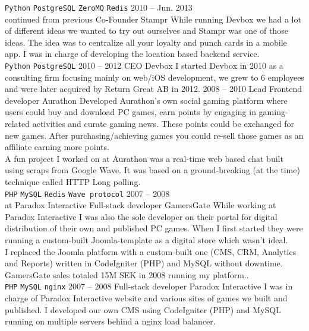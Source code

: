 \documentclass[9pt]{template} %
\begin{document}
\begin{entrylist}
{      \texttt{Python}\slashsep
      \texttt{PostgreSQL}\slashsep
      \texttt{ZeroMQ}\slashsep
      \texttt{Redis}
    }
  \entry
    {2010 -- Jun. 2013\\\footnotesize{continued from previous}}
    {Co-Founder}
    {Stampr}
    {While running Devbox we had a lot of different ideas we wanted to try out ourselves and Stampr was one of those ideas. The idea was to centralize all your loyalty and punch cards in a mobile app. I was in charge of developing the location based backend service.\\
      \texttt{Python}\slashsep
      \texttt{PostgreSQL}
    }
  \entry
    {2010 -- 2012}
    {CEO}
    {Devbox}
    {I started Devbox in 2010 as a consulting firm focusing mainly on web/iOS development, we grew to 6 employees and were later acquired by Return Great AB in 2012.}
  \entry
    {2008 -- 2010}
    {Lead Frontend developer}
    {Aurathon}
    {Developed Aurathon’s own social gaming platform where users could buy and download PC games, earn points by engaging in gaming-related activities and curate gaming news. These points could be exchanged for new games. After purchasing/achieving games you could re-sell those games as an affiliate earning more points.\\
      A fun project I worked on at Aurathon was a real-time web based chat built using scraps from Google Wave. It was based on a ground-breaking (at the time) technique called HTTP Long polling.\\
      \texttt{PHP}\slashsep
      \texttt{MySQL}\slashsep
      \texttt{Redis}\slashsep
      \texttt{Wave protocol}
    }
  \entry
    {2007 -- 2008\\\footnotesize{at Paradox Interactive}}
    {Full-stack developer}
    {GamersGate}
    {While working at Paradox Interactive I was also the sole developer on their portal for digital distribution of their own and published PC games. When I first started they were running a custom-built Joomla-template as a digital store which wasn’t ideal.\\
      I replaced the Joomla platform with a custom-built one (CMS, CRM, Analytics and Reports) written in CodeIgniter (PHP) and MySQL without downtime.\\
      GamersGate sales totaled 15M SEK in 2008 running my platform..\\
      \texttt{PHP}\slashsep
      \texttt{MySQL}\slashsep
      \texttt{nginx}
    }
  \entry
    {2007 -- 2008}
    {Full-stack developer}
    {Paradox Interactive}
    {I was in charge of Paradox Interactive website and various sites of games we built and published. I developed our own CMS using CodeIgniter (PHP) and MySQL running on multiple servers behind a nginx load balancer.\\
}
\end{entrylist}
\end{document}
